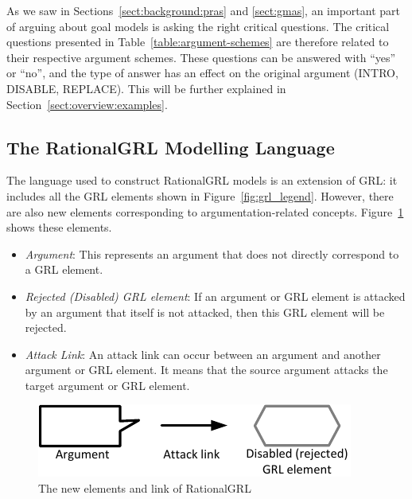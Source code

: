 As we saw in Sections~\ref{sect:background:pras} and \ref{sect:gmas}, an important part of arguing about goal models is asking the right critical questions. The critical questions presented in Table~\ref{table:argument-schemes} are therefore related to their respective argument schemes. These questions can be answered with ``yes'' or ``no'', and the type of answer has an effect on the original argument (\textsf{INTRO}, \textsf{DISABLE}, \textsf{REPLACE}). This will be further explained in Section~\ref{sect:overview:examples}. 

\subsection{The RationalGRL Modelling Language}
\label{sect:overview:lang}\label{sect:metamodel}
The language used to construct RationalGRL models is an extension of GRL: it includes all the GRL elements shown in Figure~\ref{fig:grl_legend}. However, there are also new elements corresponding to argumentation-related concepts. Figure~\ref{fig:rationalgrllegend} shows these elements. 
\begin{itemize}
\item \emph{Argument}: This represents an argument that does not directly correspond to a GRL element.  
\item \emph{Rejected (Disabled) GRL element}: If an argument or GRL element is attacked by an argument that itself is not attacked, then this GRL element will be rejected. 
\item \emph{Attack Link}: An attack link can occur between an argument and another argument or GRL element. It means that the source argument attacks the target argument or GRL element.
\end{itemize} 

\begin{figure}[b]
\centering
\includegraphics{img/legend.pdf}
\caption{The new elements and link of RationalGRL}
\label{fig:rationalgrllegend}
\end{figure}

